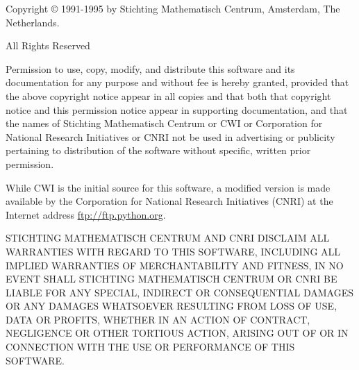 Copyright \copyright{} 1991-1995 by Stichting Mathematisch Centrum,
Amsterdam, The Netherlands.

\begin{center}
All Rights Reserved
\end{center}

Permission to use, copy, modify, and distribute this software and its
documentation for any purpose and without fee is hereby granted,
provided that the above copyright notice appear in all copies and that
both that copyright notice and this permission notice appear in
supporting documentation, and that the names of Stichting Mathematisch
Centrum or CWI or Corporation for National Research Initiatives or
CNRI not be used in advertising or publicity pertaining to
distribution of the software without specific, written prior
permission.

While CWI is the initial source for this software, a modified version
is made available by the Corporation for National Research Initiatives
(CNRI) at the Internet address \url{ftp://ftp.python.org}.

STICHTING MATHEMATISCH CENTRUM AND CNRI DISCLAIM ALL WARRANTIES WITH
REGARD TO THIS SOFTWARE, INCLUDING ALL IMPLIED WARRANTIES OF
MERCHANTABILITY AND FITNESS, IN NO EVENT SHALL STICHTING MATHEMATISCH
CENTRUM OR CNRI BE LIABLE FOR ANY SPECIAL, INDIRECT OR CONSEQUENTIAL
DAMAGES OR ANY DAMAGES WHATSOEVER RESULTING FROM LOSS OF USE, DATA OR
PROFITS, WHETHER IN AN ACTION OF CONTRACT, NEGLIGENCE OR OTHER
TORTIOUS ACTION, ARISING OUT OF OR IN CONNECTION WITH THE USE OR
PERFORMANCE OF THIS SOFTWARE.
